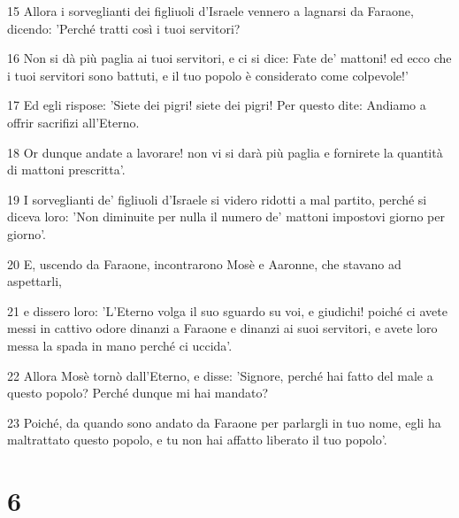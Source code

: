 \par 15 Allora i sorveglianti dei figliuoli d'Israele vennero a lagnarsi da Faraone, dicendo: 'Perché tratti così i tuoi servitori?
\par 16 Non si dà più paglia ai tuoi servitori, e ci si dice: Fate de' mattoni! ed ecco che i tuoi servitori sono battuti, e il tuo popolo è considerato come colpevole!'
\par 17 Ed egli rispose: 'Siete dei pigri! siete dei pigri! Per questo dite: Andiamo a offrir sacrifizi all'Eterno.
\par 18 Or dunque andate a lavorare! non vi si darà più paglia e fornirete la quantità di mattoni prescritta'.
\par 19 I sorveglianti de' figliuoli d'Israele si videro ridotti a mal partito, perché si diceva loro: 'Non diminuite per nulla il numero de' mattoni impostovi giorno per giorno'.
\par 20 E, uscendo da Faraone, incontrarono Mosè e Aaronne, che stavano ad aspettarli,
\par 21 e dissero loro: 'L'Eterno volga il suo sguardo su voi, e giudichi! poiché ci avete messi in cattivo odore dinanzi a Faraone e dinanzi ai suoi servitori, e avete loro messa la spada in mano perché ci uccida'.
\par 22 Allora Mosè tornò dall'Eterno, e disse: 'Signore, perché hai fatto del male a questo popolo? Perché dunque mi hai mandato?
\par 23 Poiché, da quando sono andato da Faraone per parlargli in tuo nome, egli ha maltrattato questo popolo, e tu non hai affatto liberato il tuo popolo'.

\chapter{6}


